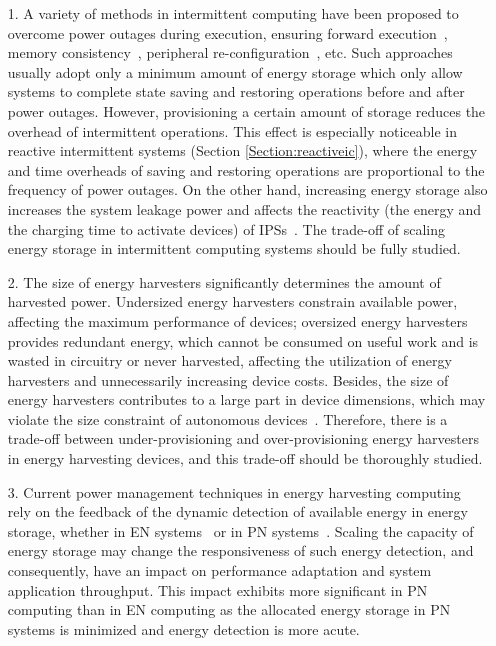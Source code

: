 \begin{itemize}
  \item [1.] A variety of methods in intermittent computing have been proposed to overcome power outages during execution, ensuring forward execution~\cite{ransford2012mementos}, memory consistency~\cite{lucia2015simpler}, peripheral re-configuration~\cite{liu2019130}, etc. Such approaches usually adopt only a minimum amount of energy storage which only allow systems to complete state saving and restoring operations before and after power outages. However, provisioning a certain amount of storage reduces the overhead of intermittent operations. This effect is especially noticeable in reactive intermittent systems (Section \ref{Section:reactiveic}), where the energy and time overheads of saving and restoring operations are proportional to the frequency of power outages. On the other hand, increasing energy storage also increases the system leakage power and affects the reactivity (the energy and the charging time to activate devices) of IPSs~\cite{colin2018reconfigurable, wu2018extensible}. The trade-off of scaling energy storage in intermittent computing systems should be fully studied. 
  \item [2.] The size of energy harvesters significantly determines the amount of harvested power. Undersized energy harvesters constrain available power, affecting the maximum performance of devices; oversized energy harvesters provides redundant energy, which cannot be consumed on useful work and is wasted in circuitry or never harvested, affecting the utilization of energy harvesters and unnecessarily increasing device costs. Besides, the size of energy harvesters contributes to a large part in device dimensions, which may violate the size constraint of autonomous devices~\cite{buchli2014dynamic}. Therefore, there is a trade-off between under-provisioning and over-provisioning energy harvesters in energy harvesting devices, and this trade-off should be thoroughly studied. 
  \item [3.] Current power management techniques in energy harvesting computing rely on the feedback of the dynamic detection of available energy in energy storage, whether in EN systems~\cite{kansal2007power, wagemann2018operating} or in PN systems~\cite{balsamo2016graceful, fletcher2017power}. Scaling the capacity of energy storage may change the responsiveness of such energy detection, and consequently, have an impact on performance adaptation and system application throughput. This impact exhibits more significant in PN computing than in EN computing as the allocated energy storage in PN systems is minimized and energy detection is more acute. 
\end{itemize}

